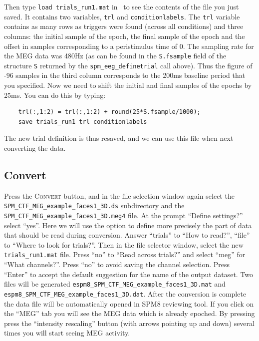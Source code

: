 Then type \texttt{load trials\_run1.mat} in \matlab\, to see the contents of the file you just saved. It contains two variables, \texttt{trl} and \texttt{conditionlabels}. The \texttt{trl} variable contains as many rows as triggers were found (across all conditions) and three columns: the initial sample of the epoch, the final sample of the epoch and the offset in samples corresponding to a peristimulus time of 0. The sampling rate for the MEG data was 480Hz (as can be found in the \texttt{S.fsample} field of the structure \texttt{S} returned by the \texttt{spm\_eeg\_definetrial} call above). Thus the figure of -96 samples in the third column corresponds to the 200ms baseline period that you specified. Now we need to shift the initial and final samples of the epochs by 25ms. You can do this by typing:

\begin{verbatim}
    trl(:,1:2) = trl(:,1:2) + round(25*S.fsample/1000);
    save trials_run1 trl conditionlabels
\end{verbatim}

The new trial definition is thus resaved, and we can use this file when next converting the data.

\subsection{Convert}

Press the \textsc{Convert} button, and in the file selection window again select the \texttt{SPM\_CTF\_MEG\_example\_\-faces1\_3D.ds} subdirectory and the \texttt{\hyphenchar{}\relax SPM\_CTF\_MEG\_example\_faces1\_3D.meg4} file. At the prompt ``Define settings?'' select ``yes''. Here we will use the option to define more precisely the part of data that should be read during conversion. Answer ``trials'' to ``How to read?'', ``file'' to ``Where to look for trials?''. Then in the file selector window, select the new \texttt{trials\_run1.mat} file. Press ``no'' to ``Read across trials?'' and select ``meg'' for ``What channels?''. Press ``no'' to avoid saving the channel selection. Press ``Enter'' to accept the default suggestion for the name of the output dataset. Two files will be generated \texttt{espm8\_SPM\_CTF\_MEG\_example\_faces1\_3D.mat} and \texttt{espm8\_SPM\_CTF\_MEG\_example\_faces1\_3D.dat}. After the conversion is complete the data file will be automatically opened in SPM8 reviewing tool. If you click on the ``MEG'' tab you will see the MEG data which is already epoched. By pressing press the ``intensity rescaling'' button (with arrows pointing up and down) several times you will start seeing MEG activity.


